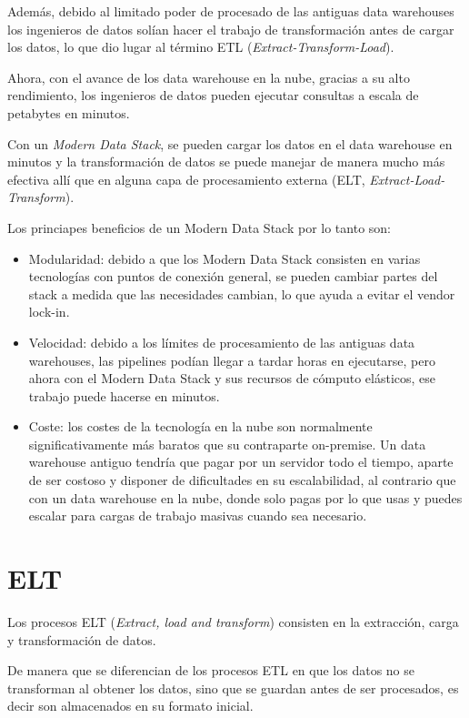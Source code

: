 Además, debido al limitado poder de procesado de las antiguas data warehouses los ingenieros de datos solían hacer el trabajo de transformación antes de cargar los datos, lo que dio lugar al término ETL (\emph{Extract-Transform-Load}).

Ahora, con el avance de los data warehouse en la nube, gracias a su alto rendimiento, los ingenieros de datos pueden ejecutar consultas a escala de petabytes en minutos. 

Con un \emph{Modern Data Stack}, se pueden cargar los datos en el data warehouse en minutos y la transformación de datos se puede manejar de manera mucho más efectiva allí que en alguna capa de procesamiento externa (ELT, \emph{Extract-Load-Transform}).

Los princiapes beneficios de un Modern Data Stack por lo tanto son:

\begin{itemize}
	\item Modularidad: debido a que los Modern Data Stack consisten en varias tecnologías con puntos de conexión general, se pueden cambiar partes del stack a medida que las necesidades cambian, lo que ayuda a evitar el vendor lock-in.
	\item Velocidad: debido a los límites de procesamiento de las antiguas data warehouses, las pipelines podían llegar a tardar horas en ejecutarse, pero ahora con el Modern Data Stack y sus recursos de cómputo elásticos, ese trabajo puede hacerse en minutos.
	\item Coste: los costes de la tecnología en la nube son normalmente significativamente más baratos que su contraparte on-premise. Un data warehouse antiguo tendría que pagar por un servidor todo el tiempo, aparte de ser costoso y disponer de dificultades en su escalabilidad, al contrario que con un data warehouse en la nube, donde solo pagas por lo que usas y puedes escalar para cargas de trabajo masivas cuando sea necesario.
\end{itemize}

\section{ELT}
Los procesos ELT (\emph{Extract, load and transform}) \cite{ELT} consisten en la extracción, carga y transformación de datos. 

De manera que se diferencian de los procesos ETL en que los datos no se transforman al obtener los datos, sino que se guardan antes de ser procesados, es decir son almacenados en su formato inicial.


